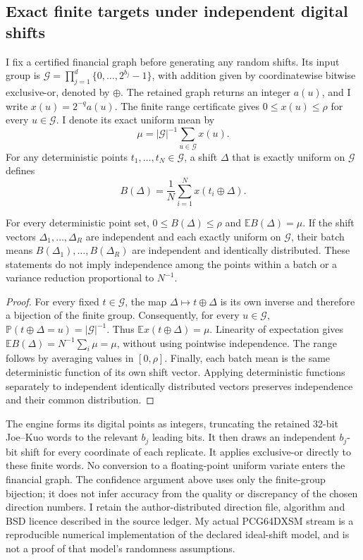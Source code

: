 \subsection{Exact finite targets under independent digital shifts}
\label{sec:rqmc-finite-target}

I fix a certified financial graph before generating any random shifts. Its input
group is $\mathcal G=\prod_{j=1}^{d}\{0,\ldots,2^{b_j}-1\}$, with addition given
by coordinatewise bitwise exclusive-or, denoted by $\oplus$. The retained graph
returns an integer $a(u)$, and I write $x(u)=2^{-q}a(u)$. The finite range
certificate gives $0\leq x(u)\leq\rho$ for every $u\in\mathcal G$. I denote
its exact uniform mean by
\[
 \mu=|\mathcal G|^{-1}\sum_{u\in\mathcal G}x(u).
\]
For any deterministic points $t_1,\ldots,t_N\in\mathcal G$, a shift
$\Delta$ that is exactly uniform on $\mathcal G$ defines
\[
 B(\Delta)=\frac1N\sum_{i=1}^{N}x(t_i\oplus\Delta).
\]

\begin{proposition}
\label{prop:rqmc-finite-unbiased}
For every deterministic point set, $0\leq B(\Delta)\leq\rho$ and
$\mathbb E B(\Delta)=\mu$. If the shift vectors $\Delta_1,\ldots,\Delta_R$
are independent and each exactly uniform on $\mathcal G$, their batch means
$B(\Delta_1),\ldots,B(\Delta_R)$ are independent and identically distributed.
These statements do not imply independence among the points within a batch
or a variance reduction proportional to $N^{-1}$.
\end{proposition}

\begin{proof}
For every fixed $t\in\mathcal G$, the map $\Delta\mapsto t\oplus\Delta$
is its own inverse and therefore a bijection of the finite group. Consequently,
for every $u\in\mathcal G$,
$\mathbb P(t\oplus\Delta=u)=|\mathcal G|^{-1}$. Thus
$\mathbb E x(t\oplus\Delta)=\mu$. Linearity of expectation gives
$\mathbb E B(\Delta)=N^{-1}\sum_i\mu=\mu$, without using pointwise
independence. The range follows by averaging values in $[0,\rho]$.
Finally, each batch mean is the same deterministic function of its own shift
vector. Applying deterministic functions separately to independent identically
distributed vectors preserves independence and their common distribution.
\end{proof}

The engine forms its digital points as integers, truncating the retained
32-bit Joe--Kuo words to the relevant $b_j$ leading bits. It then draws an
independent $b_j$-bit shift for every coordinate of each replicate. It applies
exclusive-or directly to these finite words. No conversion to a floating-point
uniform variate enters the financial graph. The confidence argument above
uses only the finite-group bijection; it does not infer accuracy from the
quality or discrepancy of the chosen direction numbers. I retain the
author-distributed direction file, algorithm and BSD licence described in
the source ledger. My actual PCG64DXSM stream is a reproducible numerical
implementation of the declared ideal-shift model, and is not a proof of
that model's randomness assumptions.

